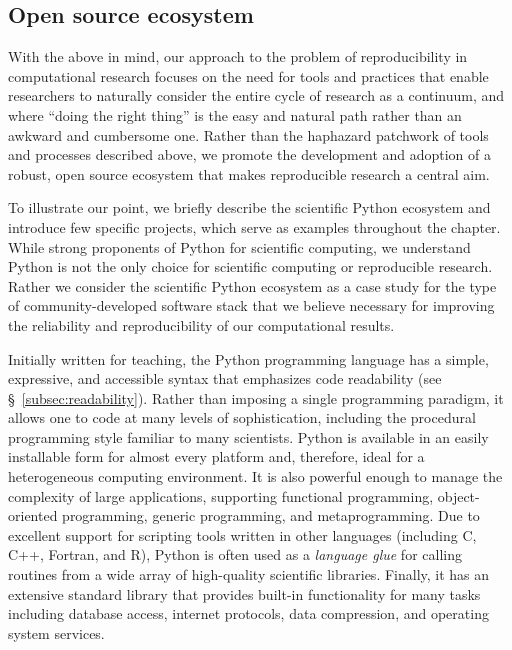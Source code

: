 \documentclass[ChapterTOCs,krantz2]{krantz} %
\begin{document}
\subsection{Open source ecosystem}

With the above in mind, our approach to the problem of reproducibility in
computational research focuses on the need for tools and practices that enable
researchers to naturally consider the entire cycle of research as a continuum,
and where ``doing the right thing'' is the easy and natural path rather than an
awkward and cumbersome one.  Rather than the haphazard patchwork of tools and
processes described above, we promote the development and adoption of a robust,
open source ecosystem that makes reproducible research a central aim.

To illustrate our point, we briefly describe the scientific Python ecosystem \cite{oliphant2007python,millman2011python,Perez2011} 
and introduce few specific projects, which serve as examples
throughout the chapter.  While strong proponents of Python for scientific
computing, we understand Python is not the only choice for scientific computing
or reproducible research.  Rather we consider the scientific Python ecosystem
as a case study for the type of community-developed software stack that we
believe necessary for improving the reliability and reproducibility of our
computational results. 

Initially written for teaching, the Python programming language has a simple,
expressive, and accessible syntax that emphasizes code readability (see
§~\ref{subsec:readability}).  Rather than imposing a single programming
paradigm, it allows one to code at many levels of sophistication, including the
procedural programming style familiar to many scientists. Python is available
in an easily installable form for almost every platform and, therefore, ideal
for a heterogeneous computing environment. It is also powerful enough to manage
the complexity of large applications, supporting functional programming,
object-oriented programming, generic programming, and metaprogramming.  Due to
excellent support for scripting tools written in other languages (including C,
C++, Fortran, and R), Python is often used as a \emph{language glue} for
calling routines from a wide array of high-quality scientific libraries.
Finally, it has an extensive standard library that provides built-in
functionality for many tasks including database access, internet protocols,
data compression, and operating system services.
\end{document}
